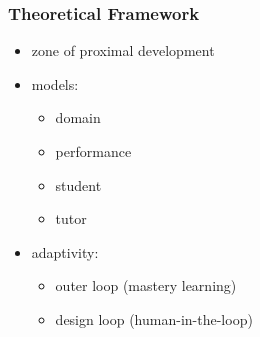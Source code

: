 \documentclass[bigger]{beamer}
\newcommand{\img}[2]{
  \begin{center}
    \texttt{[image: figures/\#2]}
  \end{center}
}
\begin{document}
\begin{frame}
  \frametitle{Theoretical Framework}

  \begin{itemize}
  \item zone of proximal development

  \item models:
  \begin{itemize}
  \item domain
  \item performance
  \item student
  \item tutor
  \end{itemize}

  \item adaptivity:
  \begin{itemize}
  \item outer loop (mastery learning)
  \item design loop (human-in-the-loop)
  \end{itemize}
  \end{itemize}


\end{frame}
\end{document}
